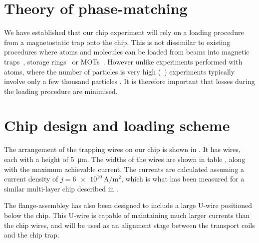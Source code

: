 \section{Theory of phase-matching}

We have established that our chip experiment will rely on a loading procedure
from a magnetostatic trap onto the chip. This is not dissimilar to existing
procedures where atoms and molecules can be loaded from beams into magnetic
traps~\cite{}, storage rings~\cite{} or MOTs~\cite{}. However unlike
experiments performed with atoms, where the number of particles is very high
(~\cite{}) \CaF experiments typically involve only a few thousand
particles \cite{}. It is therefore important that losses during the loading
procedure are minimised.


\section{Chip design and loading scheme}

The arrangement of the trapping wires on our chip is shown in
. It has  wires, each with a height
of \SI{5}{\micro\meter}. The widths of the wires are shown in table
, along with the maximum achievable current. The
currents are calculated assuming a current density of
$j=\SI{6e10}{\ampere\per\meter\squared}$, which is what has been measured for a
similar multi-layer chip described in .

\begin{figure}[h]
\vspace{0.8cm}
\centering
  \caption{}
  \label{design:fig:chip}
\end{figure}

The flange-assembley  has also been designed to include a
large U-wire positioned below the chip. This U-wire is capable of maintaining
much larger currents than the chip wires, and will be used as an alignment
stage between the transport coils and the chip trap.

